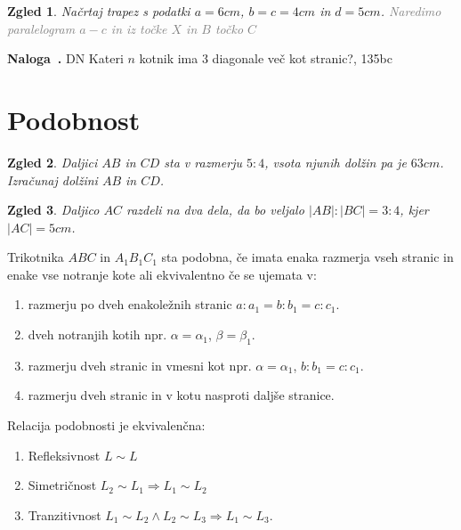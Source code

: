 \documentclass{article}
\newcounter{example}[section]
\newenvironment{example}[1][]{\refstepcounter{example}\par\medskip
   \noindent \textbf{Naloga~\theexample. #1} \rmfamily}{\medskip}
\newtheorem*{zgled}{Zgled}
\begin{document}
\begin{zgled}
    Načrtaj trapez s podatki $a=6cm$, $b=c=4cm$ in $d=5cm$. \textcolor{gray}{Naredimo paralelogram $a-c$ in iz točke $X$ in $B$ točko $C$}
\end{zgled}

\begin{example}
    DN Kateri $n$ kotnik ima $3$ diagonale več kot stranic?, 135bc
\end{example}


\section{Podobnost}

\begin{zgled}
    Daljici $AB$ in $CD$ sta v razmerju $5:4$, vsota njunih dolžin pa je $63cm$. Izračunaj dolžini $AB$ in $CD$.
\end{zgled}

\begin{zgled}
    Daljico $AC$ razdeli na dva dela, da bo veljalo $|AB|:|BC|=3:4$, kjer $|AC|=5cm$.
\end{zgled}

Trikotnika $ABC$ in $A_1 B_1 C_1$ sta podobna, če imata enaka razmerja vseh stranic in enake vse notranje kote ali ekvivalentno če se ujemata v:
\begin{enumerate}[i]
    \item razmerju po dveh enakoležnih stranic $a:a_1 = b:b_1 =c: c_1$.
    \item dveh notranjih kotih npr. $\alpha = \alpha_1$, $\beta =\beta_1$.
    \item razmerju dveh stranic in vmesni kot npr. $\alpha =\alpha_1$, $b:b_1 = c: c_1$.
    \item razmerju dveh stranic in v kotu nasproti daljše stranice.
  \end{enumerate}

  Relacija podobnosti je ekvivalenčna:
  \begin{enumerate}[i]
    \item Refleksivnost $L\sim L$
    \item Simetričnost $L_2\sim L_1 \Rightarrow L_1 \sim L_2$
    \item Tranzitivnost $L_1 \sim L_2 \land L_2 \sim L_3 \Rightarrow L_1 \sim L_3$.
  \end{enumerate}
\end{document}
